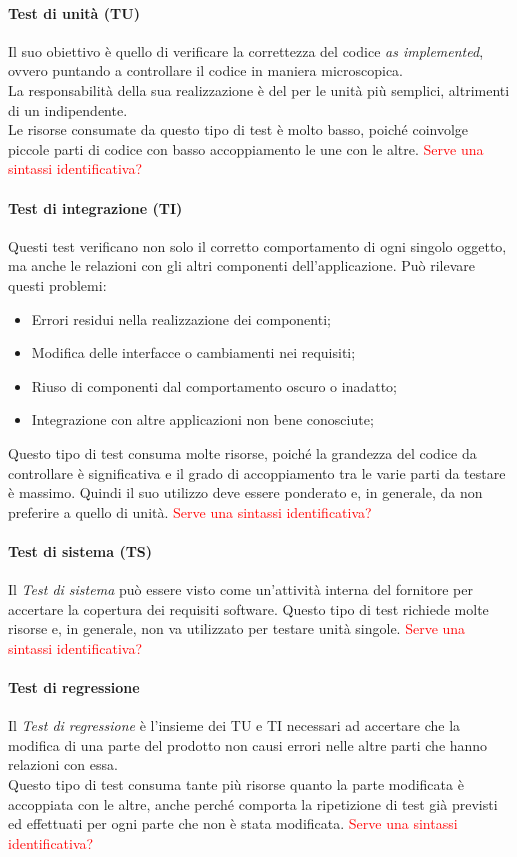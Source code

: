 	\paragraph{\textbf{Test di unità (TU)}}
	Il suo obiettivo è quello di verificare la correttezza del codice \emph{as implemented}, ovvero
	puntando a controllare il codice in maniera microscopica.
	\\La responsabilità della sua realizzazione è del \progr per le unità più semplici, altrimenti
	di un \ver indipendente.
	\\Le risorse consumate da questo tipo di test è molto basso, poiché coinvolge piccole parti di codice
	con basso accoppiamento le une con le altre. 
	\textcolor{red}{Serve una sintassi identificativa?}
	\paragraph{\textbf{Test di integrazione (TI)}}
	Questi test verificano non solo il corretto comportamento di ogni singolo oggetto, 
	ma anche le relazioni con gli altri componenti dell'applicazione.
	Può rilevare questi problemi:
	\begin{itemize}
		\item Errori residui nella realizzazione dei componenti;
		\item Modifica delle interfacce o cambiamenti nei requisiti;
		\item Riuso di componenti dal comportamento oscuro o inadatto;
		\item Integrazione con altre applicazioni non bene conosciute;
	\end{itemize}
	Questo tipo di test consuma molte risorse, poiché la grandezza del codice da controllare è 
	significativa e	il grado di accoppiamento tra le varie parti da testare è massimo. 
	Quindi il suo utilizzo deve essere ponderato e, in generale, da non preferire a quello di unità.
	\textcolor{red}{Serve una sintassi identificativa?}
	\paragraph{\textbf{Test di sistema (TS)}}
	Il \emph{Test di sistema} può essere visto come un'attività interna del fornitore
	per accertare la copertura dei requisiti software.
	\newline{}Questo tipo di test richiede molte risorse e, in generale, non va utilizzato per testare
	unità singole.
	\textcolor{red}{Serve una sintassi identificativa?}
	\paragraph{\textbf{Test di regressione}}
	Il \emph{Test di regressione} è l'insieme dei TU e TI necessari ad accertare che la modifica
	di una parte del prodotto non causi errori nelle altre parti che hanno relazioni con essa.
	\\Questo tipo di test consuma tante più risorse quanto la parte modificata è accoppiata con le altre, 
	anche perché comporta la ripetizione di test già previsti ed effettuati per ogni parte che non è 
	stata modificata.
	\textcolor{red}{Serve una sintassi identificativa?}
